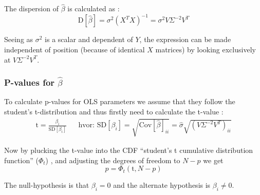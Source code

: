 The dispersion of $\hat{\beta}$ is calculated as \cite[theorem~3.2]{time-series-analysis}:
\begin{equation}
\mathrm{D}[\hat{\beta}] = \sigma^2 (X^T X)^{-1} = \sigma^2 V \Sigma^{-2} V^T
\end{equation}

Seeing as $\sigma^2$ is a scalar and dependent of $Y$, the expression can be made independent of position (because of identical $X$ matrices) by looking exclusively at $V \Sigma^{-2} V^T$.


\subsubsection{P-values for $\hat{\beta}$}

To calculate p-values for OLS parameters we assume that they follow the student's t-distribution and thus firstly need to calculate the t-value \cite{t-value-ols}:
\begin{align}
\mathrm{t} = \frac{\beta_i}{\mathrm{SD}[\beta_i]} && \text{hvor: } \mathrm{SD}[\beta_i] = \sqrt{\mathrm{Cov}[\hat{\beta}]_{ii}} = \hat{\sigma} \sqrt{ (V \Sigma^{-2} V^T)_{ii} }
\end{align}

Now by plucking the t-value into the CDF ``student's t cumulative distribution function'' ($\Phi_t$) , and adjusting the degrees of freedom to $N - p$ we get
\begin{equation}
p = \Phi_t\left(\mathrm{t}, N-p\right)
\end{equation}

The null-hypothesis is that $\beta_i = 0$ and the alternate hypothesis is $\beta_i \not = 0$.

